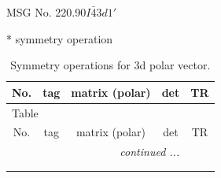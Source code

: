 \documentclass[fleqn,8pt]{jsarticle}
\begin{document}
\setcounter{MaxMatrixCols}{32}

\renewcommand{\tablename}{Table~}
\renewcommand{\figurename}{Figure~}
\begin{center}
\LARGE
MSG No. 220.90\quad$I\bar{4}3d1'$
\end{center}
* symmetry operation
\renewcommand{\arraystretch}{1.3}
\begin{longtable}{ccccc}
\caption{Symmetry operations for 3d polar vector.}
 \\
 \hline \hline
No. & tag & matrix (polar) & det & TR \\ \hline \endfirsthead

\multicolumn{4}{l}{\tablename\ \thetable{}} \\
 \hline \hline
No. & tag & matrix (polar) & det & TR \\ \hline \endhead

 \hline \hline
\multicolumn{4}{r}{\footnotesize\it continued ...} \\ \endfoot

 \hline \hline
\multicolumn{4}{r}{} \\ \endlastfoot


\end{longtable}
\end{document}
